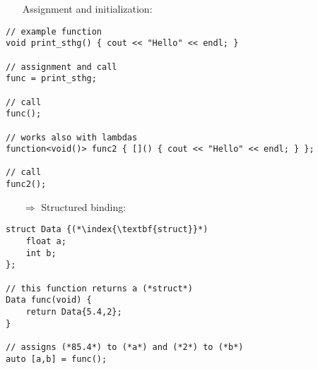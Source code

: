 \documentclass[10pt]{article}
\begin{document}
\begin{enumerate}
\item[] Assignment and initialization:
\end{enumerate}
\begin{lstlisting}
// example function
void print_sthg() { cout << "Hello" << endl; }

// assignment and call
func = print_sthg;

// call
func();

// works also with lambdas
function<void()> func2 { []() { cout << "Hello" << endl; } };

// call
func2();
\end{lstlisting}
\begin{enumerate}
\item[$\Rightarrow$] Structured binding:
\end{enumerate}
\begin{lstlisting}
struct Data {(*\index{\textbf{struct}}*)
    float a;
    int b;
};

// this function returns a (*struct*)
Data func(void) {
    return Data{5.4,2};
}

// assigns (*85.4*) to (*a*) and (*2*) to (*b*)
auto [a,b] = func();
\end{lstlisting}
%
%
\end{document}
